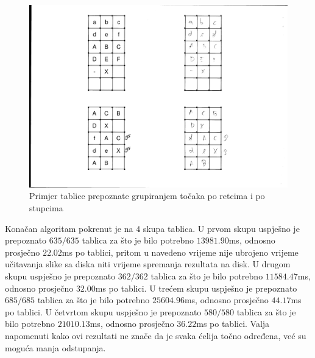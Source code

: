 \documentclass[times, utf8, zavrsni, numeric]{fer}
\begin{document}
\begin{figure}[ht!]
    \centering
    \includegraphics[width=.75\linewidth]{Images/tableV2.png}
    \captionsetup{justification=centering}
    \caption{Primjer tablice prepoznate grupiranjem točaka po retcima i po stupcima}
    \label{fig:tableV2}
\end{figure}

Konačan algoritam pokrenut je na $4$ skupa tablica.
U prvom skupu uspješno je prepoznato $635/635$ tablica za što je bilo potrebno $13981.90$ms, odnosno prosječno $22.02$ms po tablici, pritom u navedeno vrijeme nije ubrojeno vrijeme učitavanja slike sa diska niti vrijeme spremanja rezultata na disk.
U drugom skupu uspješno je prepoznato $362/362$ tablica za što je bilo potrebno $11584.47$ms, odnosno prosječno $32.00$ms po tablici.
U trećem skupu uspješno je prepoznato $685/685$ tablica za što je bilo potrebno $25604.96$ms, odnosno prosječno $44.17$ms po tablici.
U četvrtom skupu uspješno je prepoznato $580/580$ tablica za što je bilo potrebno $21010.13$ms, odnosno prosječno $36.22$ms po tablici.
Valja napomenuti kako ovi rezultati ne znače da je svaka ćelija točno određena, već su moguća manja odstupanja.\\
\end{document}
